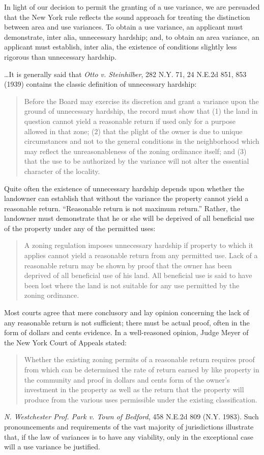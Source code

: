 In light of our decision to permit the granting of a use variance, we are
persuaded that the New York rule reflects the sound approach for treating the
distinction between area and use variances. To obtain a use variance, an
applicant must demonstrate, inter alia, unnecessary hardship; and, to obtain an
area variance, an applicant must establish, inter alia, the existence of
conditions slightly less rigorous than unnecessary hardship.

\ldots It is generally said that \emph{Otto v. Steinhilber}, 282 N.Y. 71, 24
N.E.2d 851, 853 (1939) contains the classic definition of unnecessary hardship: 
\begin{quote}
Before the Board may exercise its discretion and grant a variance upon the
ground of unnecessary hardship, the record must show that (1) the land in
question cannot yield a reasonable return if used only for a purpose allowed in
that zone; (2) that the plight of the owner is due to unique circumstances and
not to the general conditions in the neighborhood which may reflect the
unreasonableness of the zoning ordinance itself; and (3) that the use to be
authorized by the variance will not alter the essential character of the
locality.
\end{quote}

Quite often the existence of unnecessary hardship depends upon whether the
landowner can establish that without the variance the property cannot yield a
reasonable return. ``Reasonable return is not maximum return.'' Rather, the
landowner must demonstrate that he or she will be deprived of all beneficial use
of the property under any of the permitted uses:
\begin{quote}
A zoning regulation imposes unnecessary hardship if property to which it applies
cannot yield a reasonable return from any permitted use. Lack of a reasonable
return may be shown by proof that the owner has been deprived of all beneficial
use of his land. All beneficial use is said to have been lost where the land is
not suitable for any use permitted by the zoning ordinance.
\end{quote}

Most courts agree that mere conclusory and lay opinion concerning the lack of
any reasonable return is not sufficient; there must be actual proof, often in
the form of dollars and cents evidence. In a well-reasoned opinion, Judge Meyer
of the New York Court of Appeals stated:
\begin{quote}
Whether the existing zoning permits of a reasonable return requires proof from
which can be determined the rate of return earned by like property in the
community and proof in dollars and cents form of the owner's investment in the
property as well as the return that the property will produce from the various
uses permissible under the existing classification.
\end{quote}
\emph{N. Westchester Prof. Park v. Town of Bedford}, 458 N.E.2d 809 (N.Y. 1983).
Such pronouncements and requirements of the vast majority of jurisdictions
illustrate that, if the law of variances is to have any viability, only in the
exceptional case will a use variance be justified. 

